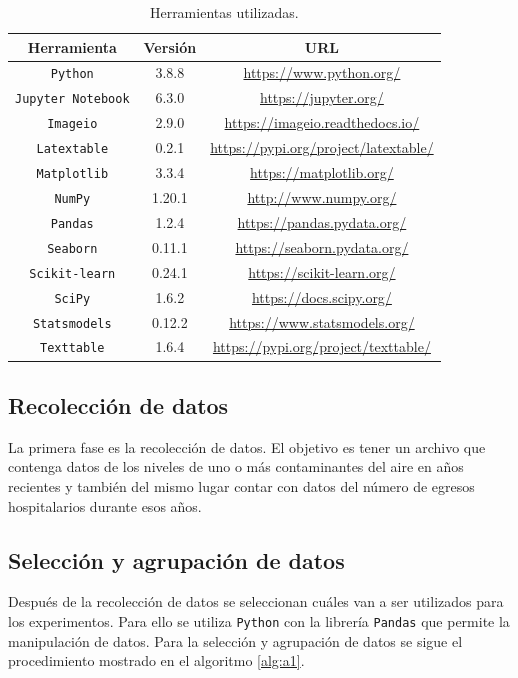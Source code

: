 \documentclass[3p,times]{elsarticle}
\begin{document}
\begin{table}[h!]
	{\centering
		\caption{Herramientas utilizadas.}
		\vspace{0.5cm}
		\begin{tabular}{|c|c|c|}
			\hline 
			Herramienta & Versión & URL\\
			\hline
			\texttt{Python} & 3.8.8 & \url{https://www.python.org/}\\
			\hline
			\texttt{Jupyter Notebook} & 6.3.0 & \url{https://jupyter.org/}\\
			\hline
			\texttt{Imageio} & 2.9.0 & \url{https://imageio.readthedocs.io/}\\
			\hline
			\texttt{Latextable} & 0.2.1 & \url{https://pypi.org/project/latextable/}\\
			\hline
			\texttt{Matplotlib} & 3.3.4 & \url{https://matplotlib.org/}\\
			\hline
			\texttt{NumPy} & 1.20.1 & \url{http://www.numpy.org/}\\
			\hline
			\texttt{Pandas} & 1.2.4 & \url{https://pandas.pydata.org/}\\
			\hline
			\texttt{Seaborn} & 0.11.1 & \url{https://seaborn.pydata.org/}\\
			\hline
			\texttt{Scikit-learn} & 0.24.1 & \url{https://scikit-learn.org/}\\
			\hline
			\texttt{SciPy} & 1.6.2 & \url{https://docs.scipy.org/}\\
			\hline
			\texttt{Statsmodels} & 0.12.2 & \url{https://www.statsmodels.org/}\\
			\hline
			\texttt{Texttable} & 1.6.4 & \url{https://pypi.org/project/texttable/}\\
			\hline
		\end{tabular}
		
	\label{tab:Herramientas utilizadas}
	}
\end{table}

\subsection{Recolección de datos}
La primera fase es la recolección de datos. El objetivo es tener un archivo que contenga datos de los niveles de uno o más contaminantes del aire en años recientes y también del mismo lugar contar con datos del número de egresos hospitalarios durante esos años.

\subsection{Selección y agrupación de datos}
Después de la recolección de datos se seleccionan cuáles van a ser utilizados para los experimentos. Para ello se utiliza \texttt{Python} con la librería \texttt{Pandas} que permite la manipulación de datos. 
Para la selección y agrupación de datos se sigue el procedimiento mostrado en el algoritmo \ref{alg:a1}.
\end{document}
